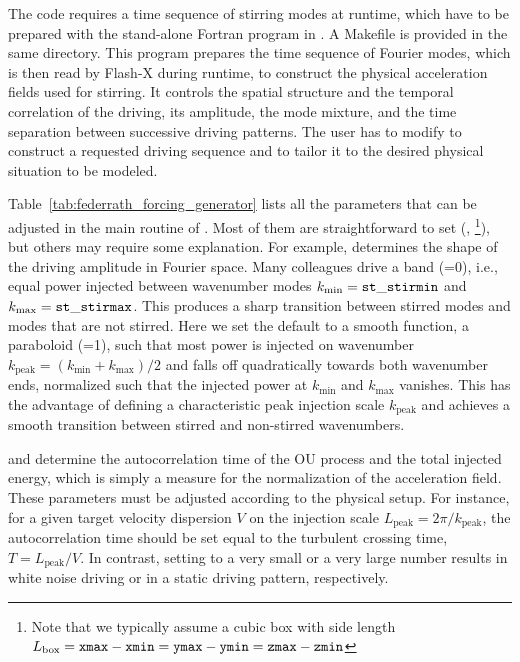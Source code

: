 The code requires a time sequence of stirring modes at runtime, which have to be prepared with the
stand-alone Fortran program  in .
A Makefile is provided in the same directory. This program prepares the time sequence of Fourier modes,
which is then read by Flash-X during runtime, to construct the physical acceleration fields used for stirring.
It controls the spatial structure and the temporal correlation of the driving, its amplitude, the mode mixture,
and the time separation between successive driving patterns. The user has to modify 
to construct a requested driving sequence and to tailor it to the desired physical situation to be modeled.

Table~\ref{tab:federrath_forcing_generator} lists all the parameters that can be adjusted in the main routine
of . Most of them are straightforward to set (,
\footnote{Note that we typically assume a cubic box with side length
$L_\mathrm{box}={\tt xmax}-{\tt xmin}={\tt ymax}-{\tt ymin}={\tt zmax}-{\tt zmin}$}), but others
may require some explanation. For example,  determines the shape of the driving amplitude
in Fourier space. Many colleagues drive a band (=0), i.e., equal power injected between
wavenumber modes $k_\mathrm{min}={\tt st\_stirmin}$ and $k_\mathrm{max}={\tt st\_stirmax}$. This produces a
sharp transition between stirred modes and modes that are not stirred. Here we set the default to a smooth
function, a paraboloid (=1), such that most power is injected on wavenumber
$k_\mathrm{peak}=(k_\mathrm{min}+k_\mathrm{max})/2$ and falls off quadratically towards both wavenumber ends,
normalized such that the injected power at $k_\mathrm{min}$ and $k_\mathrm{max}$ vanishes. This has the
advantage of defining a characteristic peak injection scale $k_\mathrm{peak}$ and achieves a smooth transition
between stirred and non-stirred wavenumbers.

 and  determine the autocorrelation time of the OU process and the total injected
energy, which is simply a measure for the normalization of the acceleration field. These parameters must be
adjusted according to the physical setup. For instance, for a given target velocity dispersion $V$ on the injection
scale $L_\mathrm{peak}=2\pi/k_\mathrm{peak}$, the autocorrelation time should be set equal to the turbulent crossing
time, $T=L_\mathrm{peak}/V$. In contrast, setting  to a very small or a very large number results
in white noise driving or in a static driving pattern, respectively.

